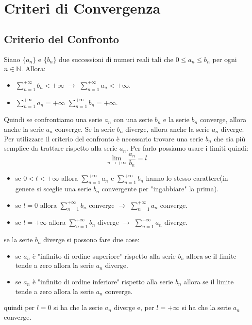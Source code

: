 \section{Criteri di Convergenza}
    \subsection{Criterio del Confronto}
        \begin{definizione}
            Siano $\{a_n\}$ e $\{b_n\}$ due successioni di numeri reali tali che $0 \leq a_n \leq b_n$ per ogni $n \in \mathbb{N}$. Allora:
            \begin{itemize}
                \item $\sum_{n=1}^{+\infty} b_n < +\infty$ $\to$ $\sum_{n=1}^{+\infty} a_n < + \infty$.
                \item $\sum_{n=1}^{+\infty} a_n = +\infty$ $\sum_{n=1}^{+\infty} b_n =+\infty$.
            \end{itemize}
        \end{definizione}
        Quindi se confrontiamo una serie $a_n$ con una serie $b_n$ e la serie $b_n$ converge, allora anche la serie $a_n$ converge. Se la serie $b_n$ diverge, allora anche la serie $a_n$ diverge.
        Per utilizzare il criterio del confronto è necessario trovare una serie $b_n$ che sia più semplice da trattare rispetto alla serie $a_n$.
        Per farlo possiamo usare i limiti quindi:
            \begin{equation}
                \lim_{n \to +\infty} \frac{a_n}{b_n} = l
            \end{equation}
        \begin{itemize}
            \item se $ 0 < l < +\infty$ allora $\sum_{n=1}^{+\infty} a_n$ e $\sum_{n=1}^{+\infty} b_n$ hanno lo stesso carattere(in genere si sceglie una serie $b_n$ convergente per "ingabbiare" la prima).
            \item se $l = 0$ allora $\sum_{n=1}^{+\infty} b_n$ converge $\to$ $\sum_{n=1}^{+\infty} a_n$ converge.
            \item se $l = +\infty$ allora $\sum_{n=1}^{+\infty} b_n$ diverge $\to$ $\sum_{n=1}^{+\infty} a_n$ diverge.
        \end{itemize}
                \begin{approfondimento}
                    se la serie $b_n$ diverge si possono fare due cose:
                        \begin{itemize}
                            \item se $a_n$ è "infinito di ordine superiore" rispetto alla serie $b_n$ allora se il limite tende a zero allora la serie $a_n$ diverge.
                            \item se $a_n$ è "infinito di ordine inferiore" rispetto alla serie $b_n$ allora se il limite tende a zero allora la serie $a_n$ converge.
                        \end{itemize}
                        quindi per $l=0$ si ha che la serie $a_n$ diverge e, per $l=+\infty$ si ha che la serie $a_n$ converge.
                \end{approfondimento}

